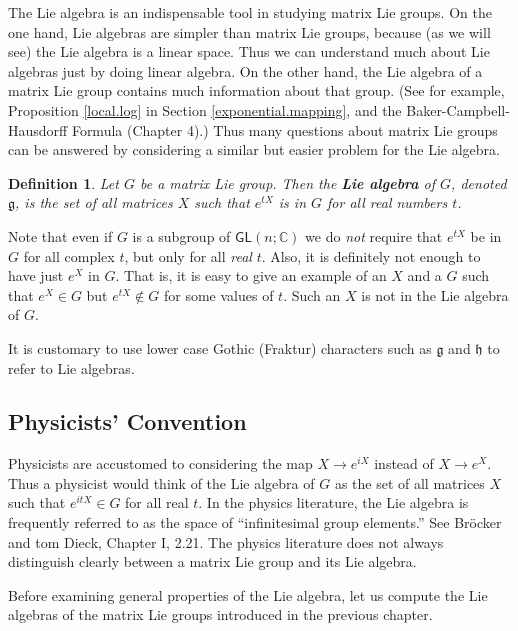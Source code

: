 \documentclass[12pt]{amsbook}
\let \frak = \mathfrak
\theoremstyle{plain}
\newtheorem{definition}[theorem]{Definition}
\numberwithin{equation}{chapter}
\numberwithin{theorem}{chapter}
\begin{document}
The Lie algebra is an indispensable tool in studying matrix Lie groups. On the
one hand, Lie algebras are simpler than matrix Lie groups, because (as we will
see) the Lie algebra is a linear space. Thus we can understand much about Lie
algebras just by doing linear algebra. On the other hand, the Lie algebra of a
matrix Lie group contains much information about that group. (See for example,
Proposition \ref{local.log} in Section \ref{exponential.mapping}, and the
Baker-Campbell-Hausdorff Formula (Chapter 4).) Thus many questions about
matrix Lie groups can be answered by considering a similar but easier problem
for the Lie algebra.

\begin{definition}
Let $G$ be a matrix Lie group. Then the \textbf{Lie algebra} of $G$, denoted
$\frak{g}$, is the set of all matrices $X$ such that $e^{tX}$ is in $G$ for
all real numbers $t$.
\end{definition}

Note that even if $G$ is a subgroup of $\mathsf{GL}(n;\mathbb{C})$ we do
\textit{not} require that $e^{tX}$ be in $G$ for all complex $t$, but only for
all \textit{real} $t$. Also, it is definitely not enough to have just $e^{X}$
in $G$. That is, it is easy to give an example of an $X$ and a $G$ such that
$e^{X}\in G$ but $e^{tX}\notin G$ for some values of $t$. Such an $X$ is not
in the Lie algebra of $G$.

It is customary to use lower case Gothic (Fraktur) characters such as
$\frak{g}$ and $\frak{h}$ to refer to Lie algebras.

\subsection{Physicists' Convention}

Physicists are accustomed to considering the map $X\rightarrow e^{iX}$ instead
of $X\rightarrow e^{X}$. Thus a physicist would think of the Lie algebra of
$G$ as the set of all matrices $X$ such that $e^{itX}\in G$ for all real $t$.
In the physics literature, the Lie algebra is frequently referred to as the
space of ``infinitesimal group elements.'' See Br\"{o}cker and tom Dieck,
Chapter I, 2.21. The physics literature does not always distinguish clearly
between a matrix Lie group and its Lie algebra.

Before examining general properties of the Lie algebra, let us compute the Lie
algebras of the matrix Lie groups introduced in the previous chapter.
\end{document}
